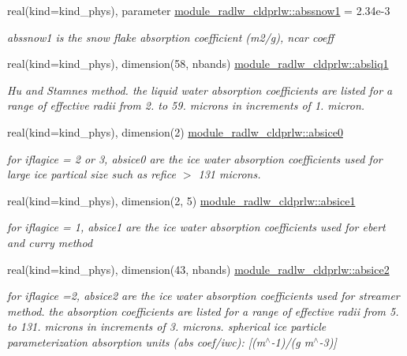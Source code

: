 \begin{DoxyCompactItemize}
real(kind=kind\+\_\+phys), parameter \hyperlink{group__module__radlw__main_ga7d12b328d9dec0c525a4b0824ae7ab44}{module\+\_\+radlw\+\_\+cldprlw\+::abssnow1} = 2.\+34e-\/3
\begin{DoxyCompactList}\small\item\em abssnow1 is the snow flake absorption coefficient (m2/g), ncar coeff \end{DoxyCompactList}\item 
real(kind=kind\+\_\+phys), dimension(58, nbands) \hyperlink{group__module__radlw__main_ga57896538226e9184c3750440d9f62166}{module\+\_\+radlw\+\_\+cldprlw\+::absliq1}
\begin{DoxyCompactList}\small\item\em Hu and Stamnes method. the liquid water absorption coefficients are listed for a range of effective radii from 2. to 59. microns in increments of 1. micron. \end{DoxyCompactList}\item 
real(kind=kind\+\_\+phys), dimension(2) \hyperlink{group__module__radlw__main_ga6610d37cab9ccd4de89237c5de536cfb}{module\+\_\+radlw\+\_\+cldprlw\+::absice0}
\begin{DoxyCompactList}\small\item\em for iflagice = 2 or 3, absice0 are the ice water absorption coefficients used for large ice partical size such as refice $>$ 131 microns. \end{DoxyCompactList}\item 
real(kind=kind\+\_\+phys), dimension(2, 5) \hyperlink{group__module__radlw__main_ga3b86ff9d6791d95170d3b3ab61cd8291}{module\+\_\+radlw\+\_\+cldprlw\+::absice1}
\begin{DoxyCompactList}\small\item\em for iflagice = 1, absice1 are the ice water absorption coefficients used for ebert and curry method \end{DoxyCompactList}\item 
real(kind=kind\+\_\+phys), dimension(43, nbands) \hyperlink{group__module__radlw__main_gad2238686c0e6d1c5d74bcfdde1542e1d}{module\+\_\+radlw\+\_\+cldprlw\+::absice2}
\begin{DoxyCompactList}\small\item\em for iflagice =2, absice2 are the ice water absorption coefficients used for streamer method. the absorption coefficients are listed for a range of effective radii from 5. to 131. microns in increments of 3. microns. spherical ice particle parameterization absorption units (abs coef/iwc)\+: \mbox{[}(m$^\wedge$-\/1)/(g m$^\wedge$-\/3)\mbox{]} \end{DoxyCompactList}\item 

\end{DoxyCompactItemize}
